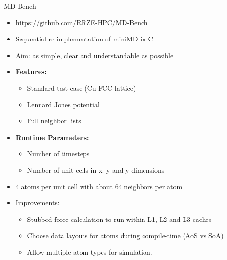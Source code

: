 \documentclass[aspectratio=169,t]{beamer}
\begin{document}

  \begin{frame}[fragile]{MD-Bench}
    \begin{itemize}
      \item \url{https://github.com/RRZE-HPC/MD-Bench}
      \item Sequential re-implementation of miniMD in C
      \item Aim: as simple, clear and understandable as possible
      \item \textbf{Features:}
      \begin{itemize}
        \item Standard test case (Cu FCC lattice)
        \item Lennard Jones potential
        \item Full neighbor lists
      \end{itemize}
      \item \textbf{Runtime Parameters:}
      \begin{itemize}
        \item Number of timesteps
        \item Number of unit cells in x, y and y dimensions 
      \end{itemize}
      \item 4 atoms per unit cell with about 64 neighbors per atom
      \item Improvements:
      \begin{itemize}
        \item Stubbed force-calculation to run within L1, L2 and L3 caches
        \item Choose data layouts for atoms during compile-time (AoS vs SoA)
        \item Allow multiple atom types for simulation.
      \end{itemize}
    \end{itemize}
  \end{frame}
\end{document}
